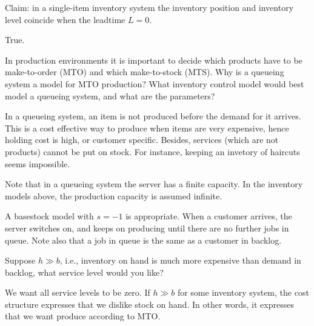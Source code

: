 \documentclass[stochastic-or.tex]{subfiles}
\begin{document}
\begin{truefalse}
Claim: in a single-item inventory system the inventory position and inventory level coincide when the leadtime $L=0$.
    \begin{solution}
        True.
    \end{solution}
\end{truefalse}

\begin{exercise}
In production environments it is important to decide which products have to be make-to-order (MTO) and which make-to-stock (MTS). Why is a queueing system a model for MTO production? What inventory control model would best model a queueing system, and what are the parameters?
\begin{solution}
In a queueing system, an item is not produced before the demand for it arrives. This is a cost effective way to produce when items are very expensive, hence holding cost is high, or customer specific. Besides, services (which are not products) cannot be put on stock. For instance, keeping an invetory of haircuts seems impossible.

Note that in a queueing system the server has a finite capacity. In the inventory models above, the production capacity is assumed infinite.

A basestock model with $s=-1$ is appropriate. When a customer arrives, the server switches on, and keeps on producing until there are no further jobs in queue. Note also that a job in queue is the same as a customer in backlog.
\end{solution}
\end{exercise}


\begin{exercise}
  Suppose $h\gg b$, i.e.,  inventory on hand is much more expensive than demand in backlog, what service level would you like?
  \begin{solution}
    We want all service levels to be zero. If $h\gg b$ for some inventory system, the cost structure expresses that we dislike stock on hand. In other words, it expresses that we want produce according to MTO.
  \end{solution}
\end{exercise}
\end{document}
